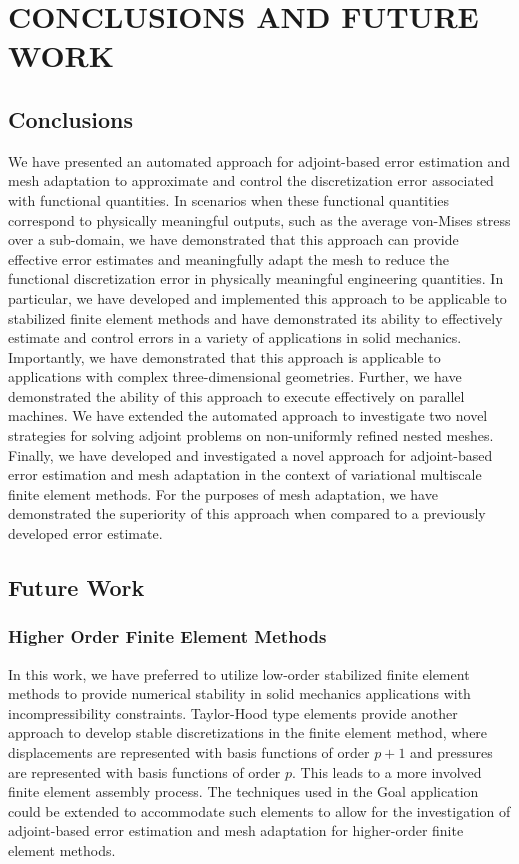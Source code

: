 \chapter{CONCLUSIONS AND FUTURE WORK}
\label{chap:conclusions}

\section{Conclusions}

We have presented an automated approach for adjoint-based error estimation and mesh
adaptation to approximate and control the discretization error associated with
functional quantities. In scenarios when these functional quantities correspond
to physically meaningful outputs, such as the average von-Mises stress over a
sub-domain, we have demonstrated that this approach can provide effective error
estimates and meaningfully adapt the mesh to reduce the functional
discretization error in physically meaningful engineering quantities.
In particular, we have developed and implemented this approach
to be applicable to stabilized finite element methods and have demonstrated its
ability to effectively estimate and control errors in a variety of applications
in solid mechanics. Importantly, we have demonstrated that this approach is applicable
to applications with complex three-dimensional geometries.
Further, we have demonstrated the ability of this approach
to execute effectively on parallel machines. We have extended the
automated approach to investigate two novel strategies for solving adjoint problems
on non-uniformly refined nested meshes. Finally, we have developed and
investigated a novel approach for adjoint-based error estimation and mesh adaptation
in the context of variational multiscale finite element methods. For the purposes
of mesh adaptation, we have demonstrated the superiority of this approach when compared
to a previously developed error estimate.

\section{Future Work}

\subsection{Higher Order Finite Element Methods}

In this work, we have preferred to utilize low-order stabilized
finite element methods to provide numerical stability in solid
mechanics applications with incompressibility constraints.
Taylor-Hood type elements provide another approach to develop
stable discretizations in the finite element method, where
displacements are represented with basis functions of order
$p+1$ and pressures are represented with basis functions of
order $p$. This leads to a more involved finite element assembly
process. The techniques used in the Goal application
could be extended to accommodate such elements to allow for the
investigation of adjoint-based  error estimation and mesh adaptation
for higher-order finite element methods.

